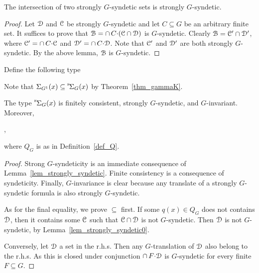 \begin{lemma}\label{lem_strongly_syndetic}
  The intersection of two strongly $G$-syndetic sets is strongly $G$-syndetic.
\end{lemma}

\begin{proof}
  Let $\EuScript D$ and $\EuScript C$ be strongly $G$-syndetic and let $C\subseteq G$ be an arbitrary finite set.
  It suffices to prove that $\EuScript B=\cap\, C{\cdot}(\EuScript C\cap\EuScript D)$ is $G$-syndetic. 
  Clearly $\EuScript B=\EuScript C'\cap\EuScript D'$, where $\EuScript C'=\cap\, C{\cdot}\EuScript C$ and $\EuScript D'=\cap\, C{\cdot}\EuScript D$.
  Note that $\EuScript C'$ and $\EuScript D'$ are both strongly $G$-syndetic.
  By the above lemma, $\EuScript B$ is $G$-syndetic.
\end{proof}

Define the following type

\smallskip

Note that $\Sigma_{G^1}(x)\subseteq{\mathstrut}^{\rm s}\kern-.2ex\Sigma_G(x)$ by Theorem~\ref{thm_gammaK}.

\begin{corollary}\label{corol_str_gen}
  The type ${\mathstrut}^{\rm s}\kern-.1ex\Sigma_G(x)$ is finitely consistent, strongly $G$-syn\-detic, and $G$-invariant.
  Moreover, \smallskip

  ,\smallskip
 
  where $Q_G$ is as in Definition~\ref{def_Q}.
\end{corollary}

\begin{proof}
  Strong $G$-syndeticity is an immediate consequence of Lemma~\ref{lem_strongly_syndetic}.
  Finite consistency is a consequence of syndeticity.
  Finally, $G$-invariance is clear because any translate of a strongly $G$-syndetic formula is also strongly $G$-syndetic.

  As for the final equality, we prove $\subseteq$ first.
  If some $q(x)\in Q_G$ does not contains $\EuScript D$, then it contains some $\EuScript C$ such that $\EuScript C\cap\EuScript D$ is not $G$-syndetic.
  Then $\EuScript D$ is not $G$-syndetic, by Lemma~\ref{lem_strongly_syndetic0}.

  Conversely, let $\EuScript D$ a set in the r.h.s.
  Then any $G$-translation of $\EuScript D$ also belong to the r.h.s.
  As this is closed under conjunction $\cap\,F{\cdot}\EuScript D$ is $G$-syndetic for every finite $F\subseteq G$. 
\end{proof}


